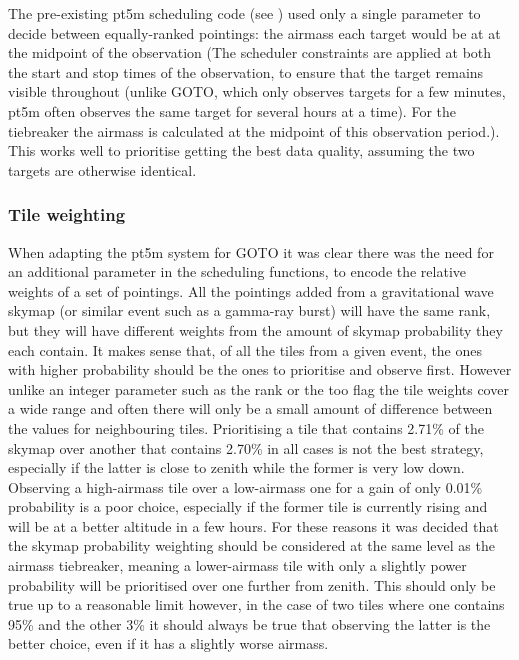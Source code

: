 \begin{colsection}
\begin{colsection}
The pre-existing \gls{pt5m} scheduling code (see ) used only a single parameter to decide between equally-ranked pointings: the airmass each target would be at at the midpoint of the observation (The scheduler constraints are applied at both the start and stop times of the observation, to ensure that the target remains visible throughout (unlike GOTO, which only observes targets for a few minutes, \gls{pt5m} often observes the same target for several hours at a time). For the tiebreaker the airmass is calculated at the midpoint of this observation period.). This works well to prioritise getting the best data quality, assuming the two targets are otherwise identical.

\subsubsection{Tile weighting}

When adapting the \gls{pt5m} system for GOTO it was clear there was the need for an additional parameter in the scheduling functions, to encode the relative weights of a set of pointings. All the pointings added from a gravitational wave skymap (or similar event such as a gamma-ray burst) will have the same rank, but they will have different weights from the amount of skymap probability they each contain. It makes sense that, of all the tiles from a given event, the ones with higher probability should be the ones to prioritise and observe first. However unlike an integer parameter such as the rank or the \gls{too} flag the tile weights cover a wide range and often there will only be a small amount of difference between the values for neighbouring tiles. Prioritising a tile that contains 2.71\% of the skymap over another that contains 2.70\% in all cases is not the best strategy, especially if the latter is close to zenith while the former is very low down. Observing a high-airmass tile over a low-airmass one for a gain of only 0.01\% probability is a poor choice, especially if the former tile is currently rising and will be at a better altitude in a few hours. For these reasons it was decided that the skymap probability weighting should be considered at the same level as the airmass tiebreaker, meaning a lower-airmass tile with only a slightly power probability will be prioritised over one further from zenith. This should only be true up to a reasonable limit however, in the case of two tiles where one contains 95\% and the other 3\% it should always be true that observing the latter is the better choice, even if it has a slightly worse airmass.


\end{colsection}
\end{colsection}
